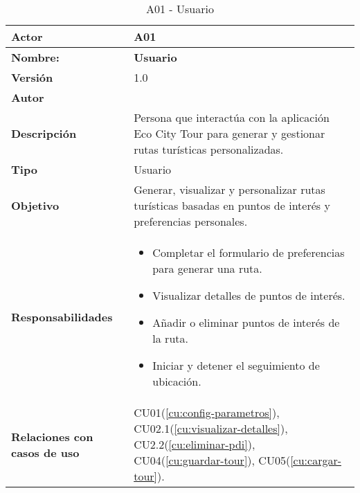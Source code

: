 \begin{table}[H]
	\centering
	\begin{tabularx}{\linewidth}{ p{} p{} }
		\toprule
		\textbf{Actor}    & A01 \\
		\toprule
		\textbf{Nombre:} 			  & \textbf{Usuario} \\
		\textbf{Versión}              & 1.0    \\
		\textbf{Autor}                & \autor \\
		\textbf{Descripción}          & Persona que interactúa con la aplicación Eco City Tour para generar y gestionar rutas turísticas personalizadas. \\
		\textbf{Tipo}                 & Usuario \\
		\textbf{Objetivo}             & Generar, visualizar y personalizar rutas turísticas basadas en puntos de interés y preferencias personales. \\
		\textbf{Responsabilidades}    & 
		\begin{itemize}
			\tightlist
			\item Completar el formulario de preferencias para generar una ruta.
			\item Visualizar detalles de puntos de interés.
			\item Añadir o eliminar puntos de interés de la ruta.
			\item Iniciar y detener el seguimiento de ubicación.
		\end{itemize}\\
		\textbf{Relaciones con casos de uso} & CU01(\ref{cu:config-parametros}), CU02.1(\ref{cu:visualizar-detalles}), CU2.2(\ref{cu:eliminar-pdi}), CU04(\ref{cu:guardar-tour}), CU05(\ref{cu:cargar-tour}). \\
		\bottomrule
	\end{tabularx}
	\caption{A01 - Usuario}
	\label{actor:usuario}
\end{table}

